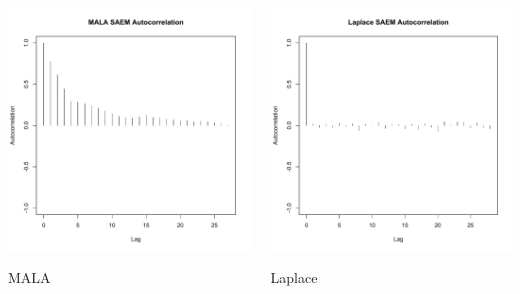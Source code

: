 \documentclass[xcolor={dvipsnames}]{beamer}
\begin{document}
\begin{frame}
\begin{columns}
\begin{column}{.30 \textwidth}
      \includegraphics[scale=0.2]{mala_autocorr.pdf}
      \begin{center}
      \caption{MALA}
      \end{center}
    \end{column}

    \begin{column}{.30 \textwidth} %
      
      \includegraphics[scale=0.2]{laplace_autocorr.pdf}
      \begin{center}
      \caption{Laplace}
      \end{center}
    \end{column}
  \end{columns}

\end{frame}
\end{document}
